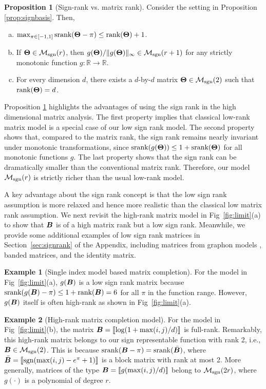 \documentclass[aos]{imsart}
\theoremstyle{definition}
\newtheorem{proposition}{Proposition}
\newtheorem{example}{Example}
\def\sign{\textup{sgn}}
\def\srank{\textup{srank}}
\def\rank{\textup{rank}}
\def\caliM{\tM_{\textup{sgn}}}
\begin{document}
\begin{proposition}[Sign-rank vs. matrix rank]\label{prop:signrank} Consider the setting in Proposition \ref{prop:signbasis}. Then,
\begin{enumerate}[(a)]
\item $\max_{\pi\in[-1,1]}\srank(\mTheta-\pi)\leq \rank(\mTheta)+1$.
\item If $\mTheta \in \caliM(r)$, then $g(\mTheta)/\mnormSize{}{g(\mTheta)}\in\caliM(r+1)$ for any strictly monotonic function $g\colon \mathbb{R}\to\mathbb{R}$.
\item For every dimension $d$, there exists a $d$-by-$d$ matrix $\mTheta\in\caliM(2)$ such that $\rank(\mTheta)= d$.  
\end{enumerate}
\end{proposition}

\noindent
Proposition \ref{prop:signrank} highlights the advantages of using the sign rank in the high dimensional matrix analysis. The first property implies that classical low-rank matrix model is a special case of our low sign rank model. The second property shows that, compared to the matrix rank, the sign rank remains nearly invariant under monotonic transformations, since $\srank(g(\mTheta)) \leq 1+\srank(\mTheta)$ for all monotonic functions $g$. The last property shows that the sign rank can be dramatically smaller than the conventional matrix rank. Therefore, our model $\caliM(r)$ is strictly richer than the usual low-rank model. 

A key advantage about the sign rank concept is that the low sign rank assumption is more relaxed and hence more realistic than the classical low matrix rank assumption. We next revisit the high-rank matrix model in Fig~\ref{fig:limit}(a) to show that $\bm B$ is of a high matrix rank but a low sign rank. Meanwhile, we provide some additional examples of low sign rank matrices in Section~\ref{sec:signrank} of the Appendix, including matrices from graphon models \cite{chan2014consistent}, banded matrices, and the identity matrix.

\begin{example}[Single index model based matrix completion]
For the model in Fig~\ref{fig:limit}(a), $g(\bm B)$ is a low sign rank matrix because $\srank(g(\mB)-\pi)\leq 1+\rank(\mB)=6$ for all $\pi$ in the function range. However, $g(\bm B)$ itself is often high-rank as shown in Fig~\ref{fig:limit}(a).
\end{example}

\begin{example}[High-rank matrix completion model]\label{ex:high-rank}
For the model in Fig~\ref{fig:limit}(b), the matrix $\bm B=\llbracket \log(1+\max(i,j)/d) \rrbracket$ is full-rank. Remarkably, this high-rank matrix belongs to our sign representable function with rank 2, i.e., $\mB\in \caliM(2)$. This is because $\srank(\mB-\pi)=\srank(\bar \mB)$, where $\bar \mB=\entry{\sign(\max(i,j)-e^\pi+1)}$ is a block matrix with rank at most 2. More generally, matrices of the type $\bm B=\llbracket g(\max(i,j)/d) \rrbracket$ belong to $\caliM(2r)$, where $g(\cdot)$ is a polynomial of degree $r$.
\end{example}
\end{document}
